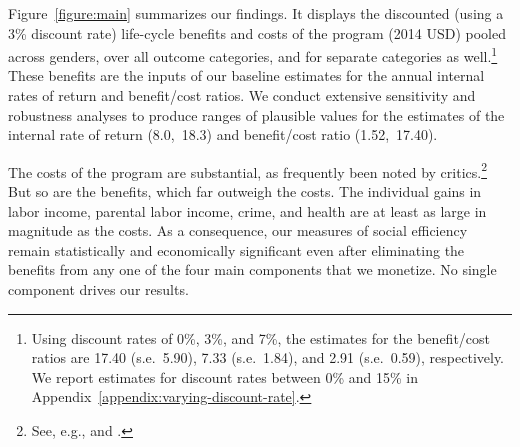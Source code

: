 \noindent Figure~\ref{figure:main} summarizes our findings. It displays the discounted (using a 3\% discount rate) life-cycle benefits and costs of the program (2014 USD) pooled across genders, over all outcome categories, and for separate categories as well.\footnote{Using discount rates of 0\%, 3\%, and 7\%, the estimates for the benefit/cost ratios are 17.40 (s.e.\ 5.90), 7.33 (s.e.\ 1.84), and 2.91 (s.e.\ 0.59), respectively. We report estimates for discount rates between 0\% and 15\% in  Appendix~\ref{appendix:varying-discount-rate}.} These benefits are the inputs of our baseline estimates for the annual internal rates of return and benefit/cost ratios. We conduct extensive sensitivity and robustness analyses to produce ranges of plausible values for the estimates of the internal rate of return (8.0,\ 18.3) and benefit/cost ratio (1.52,\ 17.40).

The costs of the program are substantial, as frequently been noted by critics.\footnote{See, e.g., \citet{Fox_News_2014_Head_Start_Effects} and \citet{Whitehurst_2014_Senate_Testimony}.} But so are the benefits, which far outweigh the costs. The individual gains in labor income, parental labor income, crime, and health are at least as large in magnitude as the costs. As a consequence, our measures of social efficiency remain statistically and economically significant even after eliminating the benefits from any one of the four main components that we monetize. No single component drives our results.

